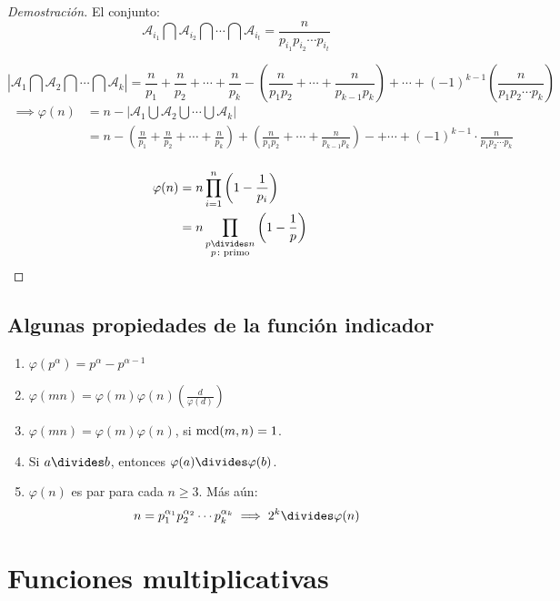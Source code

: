 \begin{theorem}
\begin{proof}[Demostración]
El conjunto:
\[\mathcal{A}_{i_1}\bigcap\mathcal{A}_{i_2}\bigcap\cdots\bigcap\mathcal{A}_{i_t}=\frac{n}{p_{i_1}p_{i_2}\cdots p_{i_t}}\]

\[\left|\mathcal{A}_1\bigcap\mathcal{A}_2\bigcap\cdots\bigcap\mathcal{A}_k\right|=\frac{n}{p_1}+\frac{n}{p_2}+\cdots+\frac{n}{p_k}-\left(\frac{n}{p_1p_2}+\cdots+\frac{n}{p_{k-1}p_{k}}\right)+\cdots+{(-1)}^{k-1}\left(\frac{n}{p_1p_2\cdots p_k}\right)%
\]
\begin{align*}
\implies \varphi(n)
&=n-\left|\mathcal{A}_1\bigcup\mathcal{A}_2\bigcup\cdots\bigcup\mathcal{A}_k\right|&\\
&=n-\left(\frac{n}{p_1}+\frac{n}{p_2}+\cdots+\frac{n}{p_k}\right)+\left(\frac{n}{p_1p_2}+\cdots+\frac{n}{p_{k-1}p_k}\right)-+\cdots+{(-1)}^{k-1}\cdot\frac{n}{p_1p_2\cdots p_k}&\\
\end{align*}

\begin{align*}
\varphi(n)
&=n\prod_{i=1}^{n}\left(1-\frac{1}{p_i}\right)&\\
&=n\prod_{\substack{p\divides n\\p\colon\text{primo}}}\left(1-\frac{1}{p}\right)&\\
\end{align*}
\end{proof}
\end{theorem}

\subsection{Algunas propiedades de la función indicador}

\begin{enumerate}
	\item $\varphi\left(p^{\alpha}\right)=p^{\alpha}-p^{\alpha-1}$
	\item $\varphi\left(mn\right)=\varphi(m)\varphi(n)\left(\frac{d}{\varphi(d)}\right)$
	\item $\varphi\left(mn\right)=\varphi(m)\varphi(n)$, si $\operatorname{mcd}(m,n)=1$.
	\item Si $a\divides b$, entonces $\varphi(a)\divides\varphi(b)$.
	\item $\varphi(n)$ es par para cada $n\geq3$. Más aún$\colon$
	\[n={p}^{\alpha_1}_{1}{p}^{\alpha_2}_{2}\cdots{p}^{\alpha_k}_{k}\implies 2^{k}\divides\varphi(n)\]
\end{enumerate}


\section{Funciones multiplicativas}

